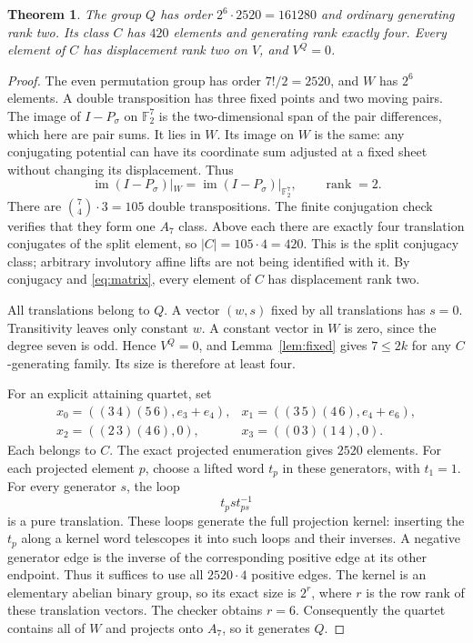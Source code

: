 \documentclass[11pt]{article}
\newtheorem{theorem}[lemma]{Theorem}
\newcommand{\F}{\mathbb F}
\newcommand{\rk}{\operatorname{rank}}
\begin{document}
\begin{theorem}\label{thm:group}
The group $Q$ has order $2^6\cdot2520=161280$ and ordinary
generating rank two. Its class $C$ has $420$ elements and generating
rank exactly four. Every element of $C$ has displacement rank two
on $V$, and $V^Q=0$.
\end{theorem}
\begin{proof}
The even permutation group has order $7!/2=2520$, and $W$ has
$2^6$ elements. A double transposition has three fixed points and
two moving pairs. The image of $I-P_\sigma$ on $\F_2^7$ is the
two-dimensional span of the pair differences, which here are pair
sums. It lies in $W$. Its image on $W$ is the same: any conjugating
potential can have its coordinate sum adjusted at a fixed sheet
without changing its displacement. Thus
\[
 \operatorname{im}(I-P_\sigma)|_W
          =\operatorname{im}(I-P_\sigma)|_{\F_2^7},\qquad\rk=2.
\]
There are $\binom74\cdot3=105$ double transpositions.
The finite conjugation check verifies that they form one $A_7$ class.
Above each there are exactly four translation conjugates of the
split element, so $|C|=105\cdot4=420$. This is the split conjugacy
class; arbitrary involutory affine lifts are not being identified with it.
By conjugacy and \eqref{eq:matrix}, every element of $C$ has
displacement rank two.

All translations belong to $Q$. A vector $(w,s)$ fixed by all
translations has $s=0$. Transitivity leaves only constant $w$.
A constant vector in $W$ is zero, since the degree seven is odd.
Hence $V^Q=0$, and Lemma~\ref{lem:fixed} gives $7\le2k$ for any
$C$-generating family. Its size is therefore at least four.

For an explicit attaining quartet, set
\[
\begin{array}{ll}
 x_0=((3\,4)(5\,6),e_3+e_4),&
 x_1=((3\,5)(4\,6),e_4+e_6),\\
 x_2=((2\,3)(4\,6),0),&
 x_3=((0\,3)(1\,4),0).
\end{array}
\]
Each belongs to $C$. The exact projected enumeration gives $2520$
elements. For each projected element $p$, choose a lifted word $t_p$
in these generators, with $t_1=1$. For every generator $s$, the loop
\[
                         t_p s t_{ps}^{-1}
\]
is a pure translation. These loops generate the full projection
kernel: inserting the $t_p$ along a kernel word telescopes it into
such loops and their inverses. A negative generator edge is the
inverse of the corresponding positive edge at its other endpoint.
Thus it suffices to use all $2520\cdot4$ positive edges.
The kernel is an elementary abelian binary group, so its exact size
is $2^r$, where $r$ is the row rank of these translation vectors.
The checker obtains $r=6$. Consequently the quartet contains all of
$W$ and projects onto $A_7$, so it generates $Q$.


\end{proof}
\end{document}
